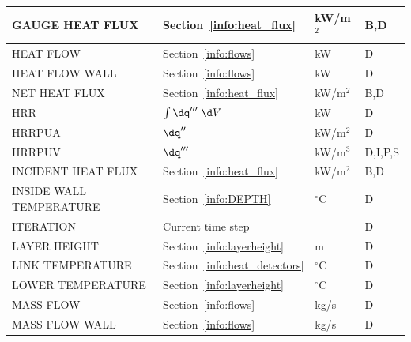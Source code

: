 \documentclass[11pt]{book}
\begin{document}
\begin{longtable}{@{\extracolsep{\fill}}|l|l|l|l|}
{\ct GAUGE HEAT FLUX}                           & Section~\ref{info:heat_flux}                  & kW/m$^2$       & B,D          \\ \hline
{\ct HEAT FLOW}                                 & Section~\ref{info:flows}                      & kW             & D            \\ \hline
{\ct HEAT FLOW WALL}                            & Section~\ref{info:flows}                      & kW             & D            \\ \hline
{\ct NET HEAT FLUX}                             & Section~\ref{info:heat_flux}                  & kW/m$^2$       & B,D          \\ \hline
{\ct HRR}                                       & $\int \dq''' \; \d V$                         & kW             & D            \\ \hline
{\ct HRRPUA}                                    & $\dq''$                                       & kW/m$^2$       & D            \\ \hline
{\ct HRRPUV}                                    & $\dq'''$                                      & kW/m$^3$       & D,I,P,S      \\ \hline
{\ct INCIDENT HEAT FLUX}                        & Section~\ref{info:heat_flux}                  & kW/m$^2$       & B,D          \\ \hline
{\ct INSIDE WALL TEMPERATURE}                   & Section~\ref{info:DEPTH}                      & $^\circ$C      & D            \\ \hline
{\ct ITERATION}                                 & Current time step                             &                & D            \\ \hline
{\ct LAYER HEIGHT}                              & Section~\ref{info:layerheight}                & m              & D            \\ \hline
{\ct LINK TEMPERATURE}                          & Section~\ref{info:heat_detectors}             & $^\circ$C      & D            \\ \hline
{\ct LOWER TEMPERATURE}                         & Section~\ref{info:layerheight}                & $^\circ$C      & D            \\ \hline
{\ct MASS FLOW}                                 & Section~\ref{info:flows}                      & kg/s           & D            \\ \hline
{\ct MASS FLOW WALL}                            & Section~\ref{info:flows}                      & kg/s           & D            \\ \hline

\end{longtable}
\end{document}
